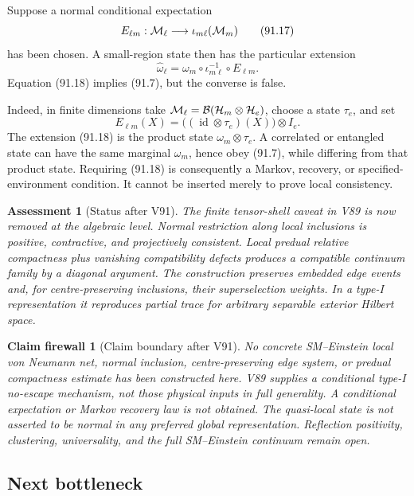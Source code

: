 \documentclass[11pt]{article}
\newtheorem{firewall}[theorem]{Claim firewall}
\newtheorem{assessment}[theorem]{Assessment}
\theoremstyle{remark}
\begin{document}
Suppose a normal conditional expectation
\[
 E_{\ell m}:{\cal M}_\ell\longrightarrow
 \iota_{m\ell}({\cal M}_m)                                      \tag{91.17}
\]
has been chosen.  A small-region state then has the particular
extension
\[
 \widehat\omega_\ell
 =\omega_m\circ\iota_{m\ell}^{-1}\circ E_{\ell m}.                \tag{91.18}
\]
Equation (91.18) implies (91.7), but the converse is false.

Indeed, in finite dimensions take
\({\cal M}_\ell={\cal B}({\cal H}_m\otimes{\cal H}_e)\), choose a
state \(\tau_e\), and set
\[
 E_{\ell m}(X)
 =\bigl((\operatorname{id}\otimes\tau_e)(X)\bigr)\otimes I_e.
                                                                    \tag{91.19}
\]
The extension (91.18) is the product state
\(\omega_m\otimes\tau_e\).  A correlated or entangled state can have
the same marginal \(\omega_m\), hence obey (91.7), while differing
from that product state.  Requiring (91.18) is consequently a
Markov, recovery, or specified-environment condition.  It cannot be
inserted merely to prove local consistency.

\begin{assessment}[Status after V91]
\label{ass:v12v91-status}
The finite tensor-shell caveat in V89 is now removed at the
algebraic level.  Normal restriction along local inclusions is
positive, contractive, and projectively consistent.  Local predual
relative compactness plus vanishing compatibility defects produces
a compatible continuum family by a diagonal argument.  The
construction preserves embedded edge events and, for
centre-preserving inclusions, their superselection weights.  In a
type-I representation it reproduces partial trace for arbitrary
separable exterior Hilbert space.
\end{assessment}

\begin{firewall}[Claim boundary after V91]
\label{fire:v12v91-claim}
No concrete SM--Einstein local von Neumann net, normal inclusion,
centre-preserving edge system, or predual compactness estimate has
been constructed here.  V89 supplies a conditional type-I
no-escape mechanism, not those physical inputs in full generality.
A conditional expectation or Markov recovery law is not obtained.
The quasi-local state is not asserted to be normal in any preferred
global representation.  Reflection positivity, clustering,
universality, and the full SM--Einstein continuum remain open.
\end{firewall}

\subsection{Next bottleneck}
\end{document}
